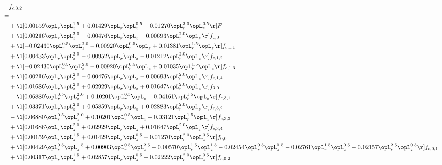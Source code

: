 \begin{alignat}{2} 
\label{eq:f_32_1} 
& f_{c,3,2} \nonumber \\ 
 = \\ 
& + \l[  0.00159 \opL_r \opL_z^{1.5} +  0.01429 \opL_r \opL_z^{0.5} +  0.01270 \opL_r^{2.0} \opL_z^{0.5}  \r] F \nonumber \\ 
& + \l[  0.00216 \opL_r \opL_z^{2.0}   -0.00476 \opL_r \opL_z   -0.00693 \opL_r^{2.0} \opL_z  \r] f_{1,0} \nonumber \\ 
& + \l[  -0.02430 \opL_r^{0.5} \opL_z^{2.0}   -0.00920 \opL_r^{0.5} \opL_z +  0.01381 \opL_r^{1.5} \opL_z  \r] f_{c,1,1} \nonumber \\ 
& + \l[  0.00433 \opL_r \opL_z^{2.0}   -0.00952 \opL_r \opL_z   -0.01212 \opL_r^{2.0} \opL_z  \r] f_{c,1,2} \nonumber \\ 
& + \l[  -0.02430 \opL_r^{0.5} \opL_z^{2.0}   -0.00920 \opL_r^{0.5} \opL_z +  0.01035 \opL_r^{1.5} \opL_z  \r] f_{c,1,3} \nonumber \\ 
& + \l[  0.00216 \opL_r \opL_z^{2.0}   -0.00476 \opL_r \opL_z   -0.00693 \opL_r^{2.0} \opL_z  \r] f_{c,1,4} \nonumber \\ 
& + \l[  0.01686 \opL_r \opL_z^{2.0} +  0.02929 \opL_r \opL_z +  0.01647 \opL_r^{2.0} \opL_z  \r] f_{3,0} \nonumber \\ 
& - \l[  0.06880 \opL_r^{0.5} \opL_z^{2.0} +  0.10201 \opL_r^{0.5} \opL_z +  0.04161 \opL_r^{1.5} \opL_z  \r] f_{c,3,1} \nonumber \\ 
& + \l[  0.03371 \opL_r \opL_z^{2.0} +  0.05859 \opL_r \opL_z +  0.02883 \opL_r^{2.0} \opL_z  \r] f_{c,3,2} \nonumber \\ 
& - \l[  0.06880 \opL_r^{0.5} \opL_z^{2.0} +  0.10201 \opL_r^{0.5} \opL_z +  0.03121 \opL_r^{1.5} \opL_z  \r] f_{c,3,3} \nonumber \\ 
& + \l[  0.01686 \opL_r \opL_z^{2.0} +  0.02929 \opL_r \opL_z +  0.01647 \opL_r^{2.0} \opL_z  \r] f_{c,3,4} \nonumber \\ 
& + \l[  0.00159 \opL_r \opL_z^{1.5} +  0.01429 \opL_r \opL_z^{0.5} +  0.01270 \opL_r^{2.0} \opL_z^{0.5}  \r] f_{0,0} \nonumber \\ 
& + \l[  0.00429 \opL_r^{0.5} \opL_z^{1.5} +  0.00903 \opL_r^{0.5} \opL_z^{2.5}   -0.00570 \opL_r^{1.5} \opL_z^{1.5}   -0.02454 \opL_r^{0.5} \opL_z^{0.5}   -0.02761 \opL_r^{1.5} \opL_z^{0.5}   -0.02157 \opL_r^{2.5} \opL_z^{0.5}  \r] f_{c,0,1} \nonumber \\ 
& + \l[  0.00317 \opL_r \opL_z^{1.5} +  0.02857 \opL_r \opL_z^{0.5} +  0.02222 \opL_r^{2.0} \opL_z^{0.5}  \r] f_{c,0,2} \nonumber \\ 

\end{alignat}
